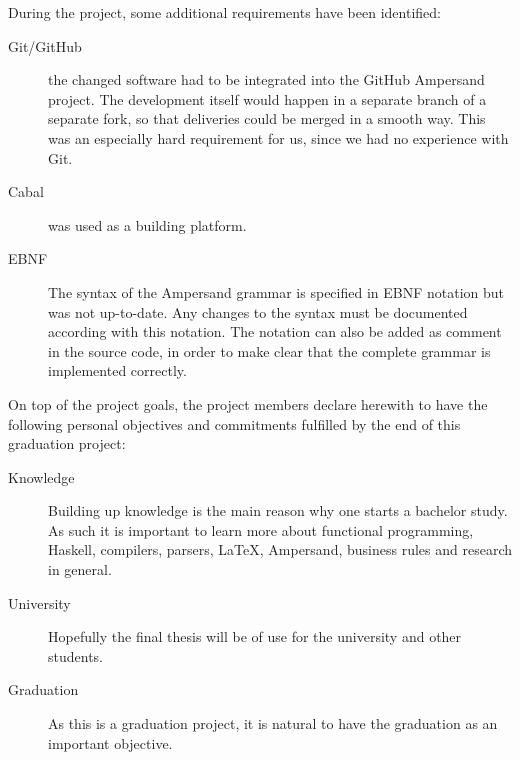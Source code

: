During the project, some additional requirements have been identified:
\begin{description}
  \item [Git/GitHub] the changed software had to be integrated into the GitHub Ampersand project.
    The development itself would happen in a separate branch of a separate fork, so that deliveries could be merged in a smooth way.
    This was an especially hard requirement for us, since we had no experience with Git.
  \item [Cabal] was used as a building platform.
  \item [EBNF] The syntax of the Ampersand grammar is specified in EBNF notation but was not up-to-date.
    Any changes to the syntax must be documented according with this notation.
    The notation can also be added as comment in the source code, in order to make clear that the complete grammar is implemented correctly.
\end{description}

On top of the project goals, the project members declare herewith to have the following personal objectives and commitments fulfilled by the end of this graduation project:
\begin{description}
	\item[Knowledge] Building up knowledge is the main reason why one starts a bachelor study.
		As such it is important to learn more about functional programming, Haskell, compilers, parsers, LaTeX, Ampersand, business rules and research in general.
	\item[University] Hopefully the final thesis will be of use for the university and other students.
	\item[Graduation] As this is a graduation project, it is natural to have the graduation as an important objective.
\end{description}
